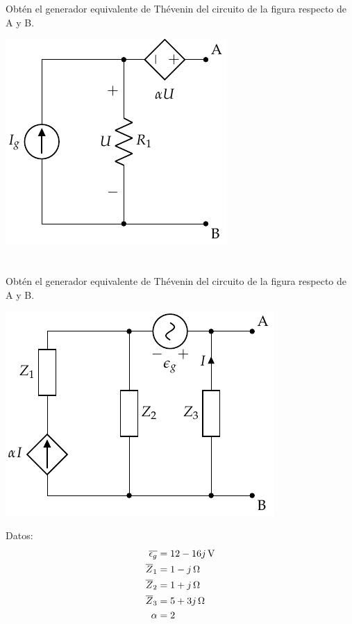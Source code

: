 \documentclass[12pt]{article}
\begin{document}
Obtén el generador equivalente de Thévenin del circuito de la figura respecto de A y B.
\begin{center}
\includegraphics{figs/Thevenin1}
\end{center}

\noindent\hrulefill

\clearpage

\section{}

Obtén el generador equivalente de Thévenin del circuito de la figura respecto de A y B.

\begin{center}
\includegraphics{figs/Thevenin4}
\end{center}

Datos:
\begin{align*}
  \overline{\epsilon_g} &= \SI[parse-numbers=false]{12 - 16j}{\volt}\\
  \overline{Z}_1 &= \SI[parse-numbers=false]{1 - j}{\ohm}\\
  \overline{Z}_2 &= \SI[parse-numbers=false]{1 + j}{\ohm}\\
  \overline{Z}_3 &= \SI[parse-numbers=false]{5 + 3j}{\ohm}\\
  \alpha &= 2
\end{align*}
\end{document}

